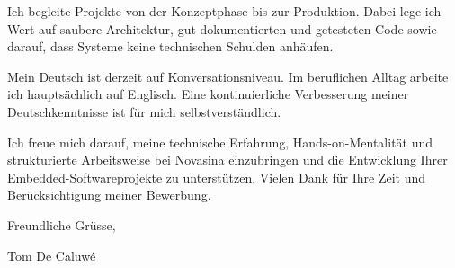 \documentclass[12pt,a4paper,ragged2e]{letter}
\begin{document}
Ich begleite Projekte von der Konzeptphase bis zur Produktion. Dabei lege ich Wert auf saubere Architektur, gut dokumentierten und getesteten Code sowie darauf, dass Systeme keine technischen Schulden anhäufen.

Mein Deutsch ist derzeit auf Konversationsniveau. Im beruflichen Alltag arbeite ich hauptsächlich auf Englisch. Eine kontinuierliche Verbesserung meiner Deutschkenntnisse ist für mich selbstverständlich.

Ich freue mich darauf, meine technische Erfahrung, Hands-on-Mentalität und strukturierte Arbeitsweise bei Novasina einzubringen und die Entwicklung Ihrer Embedded-Softwareprojekte zu unterstützen. Vielen Dank für Ihre Zeit und Berücksichtigung meiner Bewerbung.

Freundliche Grüsse,

Tom De Caluwé
\end{document}
